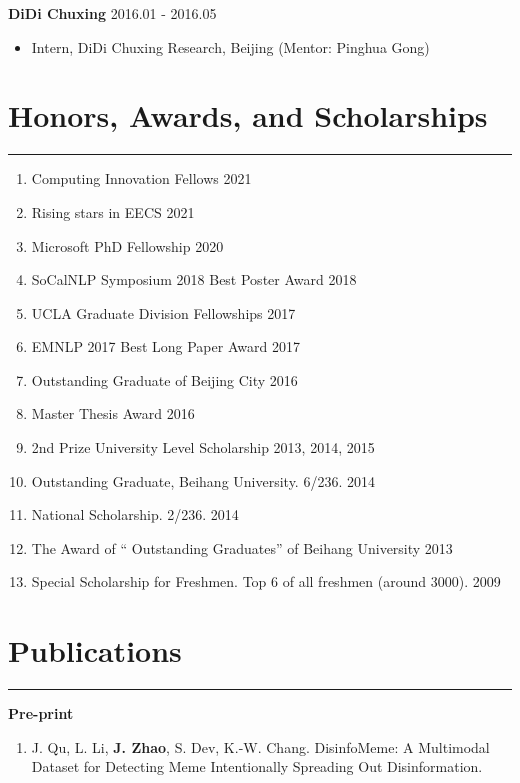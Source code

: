 \documentclass[11pt, a4paper]{article}
\newcommand{\hr}{\hrule\vspace{0.5em}}
\begin{document}
\textbf{DiDi Chuxing} \hfill 2016.01 - 2016.05
	\begin{itemize}[leftmargin=20pt]
	\item[] Intern, DiDi Chuxing Research, Beijing (Mentor: Pinghua Gong)
	\end{itemize}



\section*{Honors, Awards, and Scholarships}
\hr
\begin{enumerate}
\item Computing Innovation Fellows \hfill 2021
\item Rising stars in EECS \hfill 2021
\item Microsoft PhD Fellowship \hfill 2020
\item SoCalNLP Symposium 2018 Best Poster Award \hfill 2018
\item UCLA Graduate Division Fellowships \hfill 2017
\item EMNLP 2017 Best Long Paper Award \hfill 2017
\item Outstanding Graduate of Beijing City \hfill 2016
\item Master Thesis Award \hfill 2016
\item 2nd Prize University Level Scholarship \hfill 2013, 2014, 2015
\item Outstanding Graduate, Beihang University. 6/236.	 \hfill 2014
\item National Scholarship. 2/236. \hfill 2014
\item The Award of `` Outstanding Graduates'' of Beihang University \hfill 2013
\item Special Scholarship for Freshmen. Top 6 of all freshmen (around 3000). \hfill 2009

\end{enumerate}

\section*{Publications}
\hr
 \hspace{0.1in}\textbf{Pre-print}
 	\begin{enumerate}
	\item J. Qu, L. Li, \textbf{J. Zhao}, S. Dev, K.-W. Chang. DisinfoMeme: A Multimodal Dataset for Detecting Meme Intentionally Spreading Out Disinformation. 
	\end{enumerate}
\end{document}
